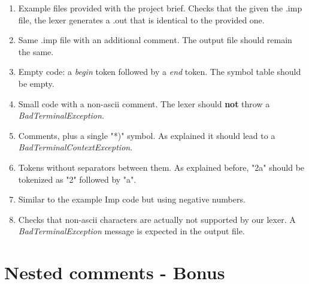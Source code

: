 \documentclass[12pt]{report}
\begin{document}
\begin{enumerate}
\item Example files provided with the project brief. Checks that the given the .imp file, the lexer generates a .out that is identical to the provided one.
\item Same .imp file with an additional comment. The output file should remain the same.
\item Empty code: a \textit{begin} token followed by a \textit{end} token. The symbol table should be empty.
\item Small code with a non-ascii comment. The lexer should \textbf{not} throw a \textit{BadTerminalException}.
\item Comments, plus a single "*)" symbol. As explained it should lead to a \textit{BadTerminalContextException}.
\item Tokens without separators between them. As explained before, "2a" should be tokenized as "2" followed by "a".
\item Similar to the example Imp code but using negative numbers.
\item Checks that non-ascii characters are actually not supported by our lexer. A \textit{BadTerminalException} message is expected in the output file.
\end{enumerate}

\chapter{Nested comments - Bonus}
\end{document}
